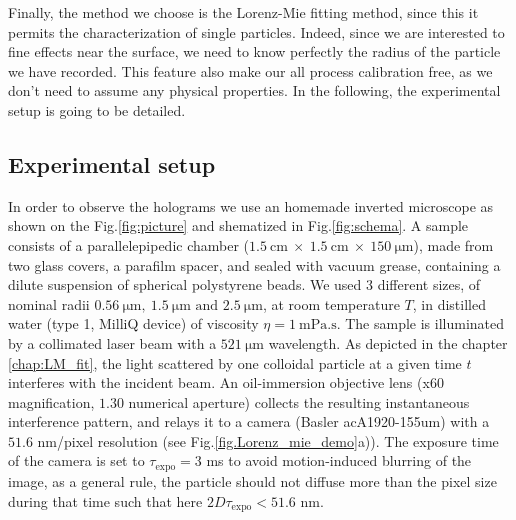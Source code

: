 Finally, the method we choose is the Lorenz-Mie fitting method, since this it permits the characterization of single particles. Indeed, since we are interested to fine effects near the surface, we need to know perfectly the radius of the particle we have recorded. This feature also make our all process calibration free, as we don't need to assume any physical properties. In the following, the experimental setup is going to be detailed.


\subsection{Experimental setup}
\label{chap:exp-setup}
In order to observe the holograms we use an homemade inverted microscope as shown on the Fig.\ref{fig:picture} and shematized in Fig.\ref{fig:schema}. A sample consists of a parallelepipedic chamber ($1.5 ~ \text{cm} ~ \times ~ 1.5 ~ \text{cm} ~ \times ~ 150 ~ \mathrm{\mu m} $), made from two glass covers, a parafilm spacer, and sealed with vacuum grease, containing a dilute suspension of spherical polystyrene beads. We used 3 different sizes, of nominal radii $0.56 ~ \mathrm{\mu m}, ~ 1.5 ~ \mathrm{\mu m} \text{ and } 2.5 ~ \mathrm{\mu m} $, at room temperature $T$, in distilled water (type 1, MilliQ device) of viscosity $\eta = 1 ~ \mathrm{mPa.s}$. The sample is illuminated by a collimated laser beam with a $521 ~ \mathrm{\mu m}$ wavelength. As depicted in the chapter \ref{chap:LM_fit}, the light scattered by one colloidal particle at a given time $t$ interferes with the incident beam. An oil-immersion objective lens (x60 magnification, $1.30$ numerical aperture) collects the resulting instantaneous interference pattern, and relays it to a camera (Basler acA1920-155um) with a $51.6$ nm/pixel resolution (see Fig.\ref{fig.Lorenz_mie_demo}a)). The exposure time of the camera is set to $\tau_{\mathrm{expo}} = 3$ ms to avoid motion-induced blurring of the image, as a general rule, the particle should not diffuse more than the pixel size during that time such that here $2D\tau_{\mathrm{expo}} < 51.6$ nm.

